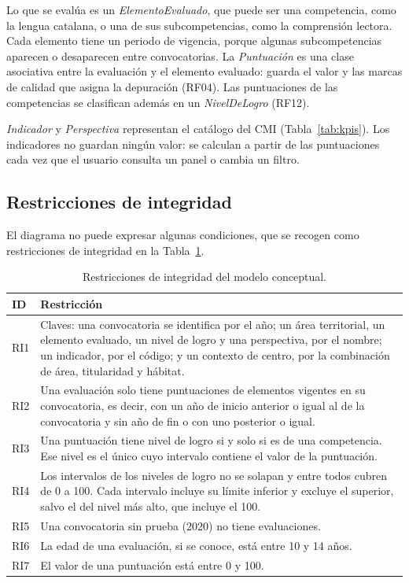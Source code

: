 \documentclass[12pt, a4paper, oneside]{report}
\begin{document}
Lo que se evalúa es un \textit{ElementoEvaluado}, que puede ser una competencia, como la lengua catalana, o una de sus subcompetencias, como la comprensión lectora. Cada elemento tiene un periodo de vigencia, porque algunas subcompetencias aparecen o desaparecen entre convocatorias. La \textit{Puntuación} es una clase asociativa entre la evaluación y el elemento evaluado: guarda el valor y las marcas de calidad que asigna la depuración (RF04). Las puntuaciones de las competencias se clasifican además en un \textit{NivelDeLogro} (RF12).

\textit{Indicador} y \textit{Perspectiva} representan el catálogo del CMI (Tabla~\ref{tab:kpis}). Los indicadores no guardan ningún valor: se calculan a partir de las puntuaciones cada vez que el usuario consulta un panel o cambia un filtro.

\subsection{Restricciones de integridad}
\label{sec:restricciones}
El diagrama no puede expresar algunas condiciones, que se recogen como restricciones de integridad en la Tabla~\ref{tab:restricciones}.

\begin{table}[H]
\centering
\small
\renewcommand{\arraystretch}{1.1}
\begin{tabularx}{\textwidth}{@{} p{1.1cm} X @{}}
\toprule
\textbf{ID} & \textbf{Restricción} \\ \midrule
RI1 & Claves: una convocatoria se identifica por el año; un área territorial, un elemento evaluado, un nivel de logro y una perspectiva, por el nombre; un indicador, por el código; y un contexto de centro, por la combinación de área, titularidad y hábitat. \\ \addlinespace
RI2 & Una evaluación solo tiene puntuaciones de elementos vigentes en su convocatoria, es decir, con un año de inicio anterior o igual al de la convocatoria y sin año de fin o con uno posterior o igual. \\ \addlinespace
RI3 & Una puntuación tiene nivel de logro si y solo si es de una competencia. Ese nivel es el único cuyo intervalo contiene el valor de la puntuación. \\ \addlinespace
RI4 & Los intervalos de los niveles de logro no se solapan y entre todos cubren de 0 a 100. Cada intervalo incluye su límite inferior y excluye el superior, salvo el del nivel más alto, que incluye el 100. \\ \addlinespace
RI5 & Una convocatoria sin prueba (2020) no tiene evaluaciones. \\ \addlinespace
RI6 & La edad de una evaluación, si se conoce, está entre 10 y 14 años. \\ \addlinespace
RI7 & El valor de una puntuación está entre 0 y 100. \\ \bottomrule
\end{tabularx}
\caption{Restricciones de integridad del modelo conceptual.}
\label{tab:restricciones}
\end{table}
\end{document}

